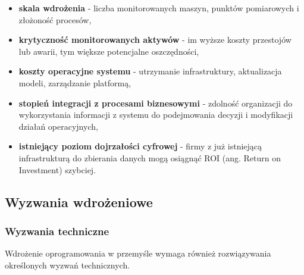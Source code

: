 \begin{itemize}
    \item \textbf{skala wdrożenia} - liczba monitorowanych maszyn, punktów pomiarowych i złożoność procesów,
    \item \textbf{krytyczność monitorowanych aktywów} - im wyższe koszty przestojów lub awarii, tym większe potencjalne oszczędności,
    \item \textbf{koszty operacyjne systemu} - utrzymanie infrastruktury, aktualizacja modeli, zarządzanie platformą,
    \item \textbf{stopień integracji z procesami biznesowymi} - zdolność organizacji do wykorzystania informacji z systemu do podejmowania decyzji i modyfikacji działań operacyjnych,
    \item \textbf{istniejący poziom dojrzałości cyfrowej} - firmy z już istniejącą infrastrukturą do zbierania danych mogą osiągnąć ROI (ang. Return on Investment) szybciej.
\end{itemize}


\subsection{Wyzwania wdrożeniowe}
\label{subsec:wyzwania_wdrozeniowe}

\subsubsection{Wyzwania techniczne}
\label{subsubsec:wyzwania_techniczne}

Wdrożenie oprogramowania w przemyśle wymaga również rozwiązywania określonych wyzwań technicznych.

